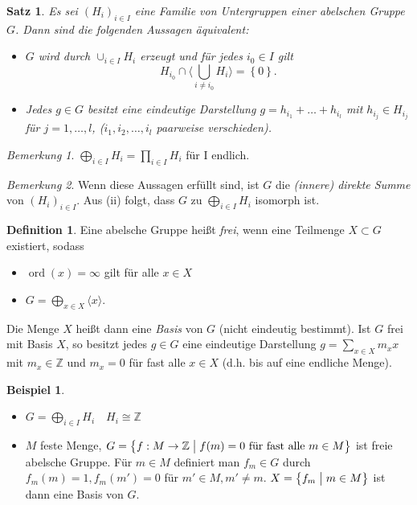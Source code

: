 \documentclass[12pt]{scrartcl} %
\newcommand{\divides}{\mathrel{\bigm|}}
\newtheorem{thm}{Satz}[section]
\theoremstyle{definition}
\newtheorem*{defn}{Definition}
\newtheorem{ex}{Beispiel}
\theoremstyle{remark}
\newtheorem*{nb}{Bemerkung}
\begin{document}
\begin{thm}
  Es sei $(H_i)_{i \in I}$ eine Familie von Untergruppen einer abelschen Gruppe $G$. Dann sind die folgenden Aussagen äquivalent:
\begin{itemize}
  \item[(i)]  $G$ wird durch $\cup_{i \in I} H_i$ erzeugt und für jedes $i_0 \in I$ gilt 
    \[ H_{i_0} \cap \langle \bigcup_{i \neq i_0} H_i \rangle = \left\{ 0 \right\}. \]
  \item Jedes $g \in G$ besitzt eine eindeutige Darstellung $g = h_{i_1} + \dots + h_{i_l}$ mit $h_{i_j} \in H_{i_j}$ für $j = 1,\dots,l$, ($i_1,i_2,\dots,i_l$ paarweise verschieden).
\end{itemize}
\end{thm}

\begin{nb}
  $ \bigoplus_{i \in I} H_i = \prod_{i \in I} H_i $ für I endlich.
\end{nb}

\begin{nb}
  Wenn diese Aussagen erfüllt sind, ist $G$ die \emph{(innere) direkte Summe} von $(H_i)_{i \in I}$. Aus (ii) folgt, dass $G$ zu $\bigoplus_{i \in I} H_i$ isomorph ist. 
\end{nb}

\begin{defn}
  Eine abelsche Gruppe heißt \emph{frei}, wenn eine Teilmenge $X \subset G$ existiert, sodass
  \begin{itemize}
    \item[(i)] $\operatorname{ord}(x) = \infty$ gilt für alle $x \in X$
    \item[(ii)] $G = \bigoplus_{x \in X} \langle x \rangle$.
  \end{itemize}

  Die Menge $X$ heißt dann eine \emph{Basis} von $G$ (nicht eindeutig bestimmt). Ist $G$ frei mit Basis $X$, so besitzt jedes $g \in G$ eine eindeutige Darstellung $g = \sum_{x \in X} m_x x$ mit $m_x \in \mathbb{Z}$ und $m_x = 0$ für fast alle $x \in X$ (d.h. bis auf eine endliche Menge).
\end{defn}

\begin{ex}
  \begin{itemize}
    \item $G = \bigoplus_{i \in I} H_i \quad H_i \cong \mathbb{Z}$
    \item $M$ feste Menge, $G = \left\{ f : M \to \mathbb{Z} \divides f(m) = 0 \text{ für fast alle } m \in M \right\}$ ist freie abelsche Gruppe.  Für $m \in M$ definiert man $f_m \in G$ durch $f_m(m) = 1, f_m(m') = 0$ für $m' \in M, m' \neq m$. $X = \left\{ f_m \divides m \in M \right\}$ ist dann eine Basis von $G$.
  \end{itemize}
\end{ex}
\end{document}
